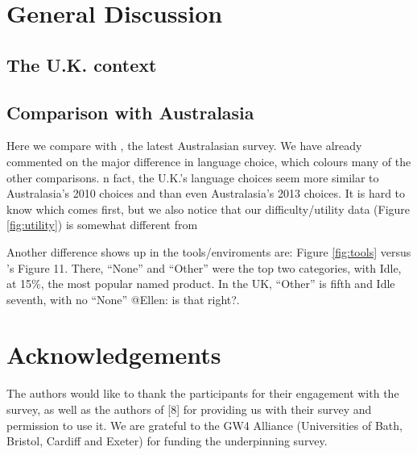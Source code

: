 \documentclass{sig-alternate}
\begin{document}
\section{General Discussion}\label{discussion}

\subsection{The U.K. context}

\subsection{Comparison with Australasia}

Here we compare with \cite{mason+cooper:2014}, the latest Australasian
survey. We have already commented on the major difference in language
choice, which colours many of the other comparisons. n fact, the
U.K.'s language choices seem more similar to Australasia's 2010
choices \cite{mason-et-al:2012} and \cite[Table 4]{mason+cooper:2014}
than even Australasia's 2013 choices. It is hard to know which comes
first, but we also notice that our difficulty/utility data (Figure
\ref{fig:utility}) is somewhat different from \cite[Figures
7,8]{mason+cooper:2014}

Another difference shows up in the tools/enviroments are: Figure
\ref{fig:tools} versus \cite{mason+cooper:2014}'s Figure 11. There,
``None'' and ``Other'' were the top two categories, with Idle, at
15\%, the most popular named product. In the UK, ``Other'' is fifth
and Idle seventh, with no ``None'' @Ellen: is that right?.


\section{Acknowledgements}

The authors would like to thank the participants for their engagement
with the survey, as well as the authors of [8] for providing us with
their survey and permission to use it.
We are grateful to the GW4 Alliance (Universities of Bath, Bristol,
Cardiff and Exeter) for funding the underpinning survey.


\end{document}
